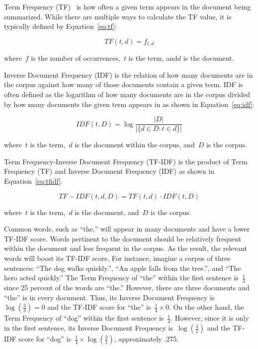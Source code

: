 \documentclass{article}[10]
\begin{document}
Term Frequency (TF)~\cite{Leskovec} is how often a given term appears in the
document being summarized. While there are multiple ways to calculate the TF
value, it is typically defined by Equation~\eqref{eq:tf}:

\begin{equation}
  TF(t, d) = f_{t, d} \label{eq:tf}
\end{equation}

where~\(f\) is the number of occurrences,~\(t\) is the term, and\(d\) is the
document.

Inverse Document Frequency (IDF) is the relation of how many documents are in
the corpus against how many of those documents contain a given term. IDF is
often defined as the logarithm of how many documents are in the corpus divided
by how many documents the given term appears in as shown in
Equation~\eqref{eq:idf}:

\begin{equation}
  IDF(t, D) = \log\frac{|D|}{|\{d \in D : t \in d\}|} \label{eq:idf}
\end{equation}

where~\(t\) is the term,~\(d\) is the document within the corpus, and~\(D\) is
the corpus.

Term Frequency-Inverse Document Frequency (TF-IDF) is the product of Term
Frequency (TF) and Inverse Document Frequency (IDF) as shown in
Equation~\eqref{eq:tfidf}.

\begin{equation}
  TF-IDF(t, d, D) = TF(t, d) \cdot IDF(t, D) \label{eq:tfidf}
\end{equation}

where~\(t\) is the term,~\(d\) is the document, and~\(D\) is the corpus.

Common words, such as ``the,'' will appear in many documents and have a lower
TF-IDF score. Words pertinent to the document should be relatively frequent
within the document and less frequent in the corpus. As the result, the relevant
words will boost its TF-IDF score. For instance, imagine a corpus of three
sentences: ``The dog walks quickly.'', ``An apple falls from the tree.'', and
``The hero acted quickly.'' The Term Frequency of ``the'' within the first
sentence is~\(\frac{1}{4}\) since 25 percent of the words are ``the.'' However,
there are three documents and ``the'' is in every document. Thus, its Inverse
Document Frequency is~\( \log(\frac{3}{3}) = 0 \) and the TF-IDF score for
``the'' is~\(\frac{1}{4} \times 0\). On the other hand, the Term Frequency of
``dog'' within the first sentence is~\(\frac{1}{4}\). However, since it is only
in the first sentence, its Inverse Document Frequency is~\(\log(\frac{3}{1})\)
and the TF-IDF score for ``dog'' is~\(\frac{1}{4} \times \log(\frac{3}{1})\),
approximately .275.
\end{document}

